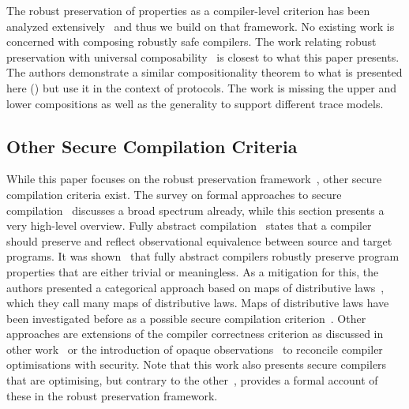 \documentclass[dvipsnames,conference]{IEEEtran}
\theoremstyle{definition}
\begin{document}
The robust preservation of properties as a compiler-level criterion has been analyzed extensively~\cite{abate2019jour,patrignani2021rsc,abate2021extacc,patrignani2019survey} and thus we build on that framework.
No existing work is concerned with composing robustly safe compilers.
The work relating robust preservation with universal composability~\cite{patrignani2022universal} is closest to what this paper presents.
The authors demonstrate a similar compositionality theorem to what is presented here () but use it in the context of protocols.
The work is missing the upper and lower compositions as well as the generality to support different trace models.

\subsection{Other Secure Compilation Criteria}\label{subsec:relw:seccompcrit}

While this paper focuses on the robust preservation framework~\cite{abate2019jour}, other secure compilation criteria exist.
The survey on formal approaches to secure compilation~\cite{patrignani2019survey} discusses a broad spectrum already, while this section presents a very high-level overview.
Fully abstract compilation~\cite{abadi1999fullabstraction} states that a compiler should preserve and reflect observational equivalence between source and target programs.
It was shown~\cite{abate2021faandrc} that fully abstract compilers robustly preserve program properties that are either trivial or meaningless.
As a mitigation for this, the authors presented a categorical approach based on maps of distributive laws~\cite{watanabe2002modl}, which they call many maps of distributive laws.
Maps of distributive laws have been investigated before as a possible secure compilation criterion~\cite{tsampas2020catsc}.
Other approaches are extensions of the compiler correctness criterion as discussed in other work~\cite{patterson2019next700} or the introduction of opaque observations~\cite{vu2021reconciling} to reconcile compiler optimisations with security.
Note that this work also presents secure compilers that are optimising, but contrary to the other~\cite{vu2021reconciling}, provides a formal account of these in the robust preservation framework.
\end{document}
